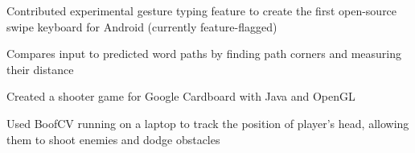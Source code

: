 \documentclass[]{deedy-resume-openfont}
\begin{document}
\begin{minipage}[t]{0.67\textwidth}
\begin{tightemize}
\item Contributed experimental gesture typing feature to create the first open-source swipe keyboard for Android (currently feature-flagged)
\item Compares input to predicted word paths by finding path corners and measuring their distance
\end{tightemize}
\sectionsep

\begin{tightemize}
\item Created a shooter game for Google Cardboard with Java and OpenGL 
\item Used BoofCV running on a laptop to track the position of player’s head, allowing them to shoot enemies and dodge obstacles
\end{tightemize}
\sectionsep

\end{minipage} 
\end{document}
